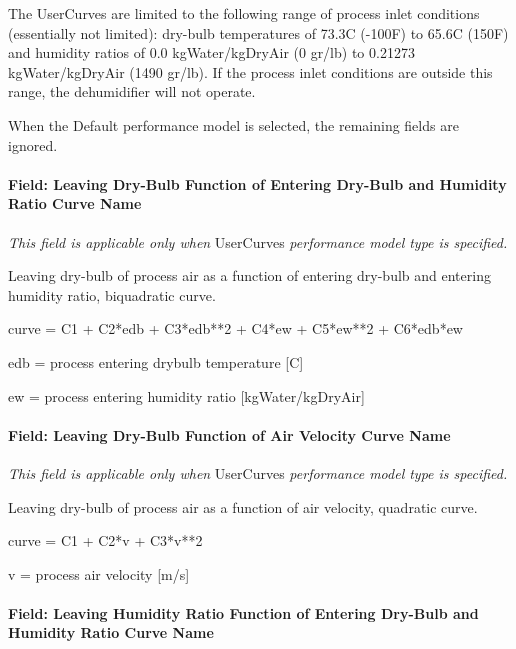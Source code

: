 The UserCurves are limited to the following range of process inlet conditions (essentially not limited): dry-bulb temperatures of 73.3C (-100F) to 65.6C (150F) and humidity ratios of 0.0 kgWater/kgDryAir (0 gr/lb) to 0.21273 kgWater/kgDryAir (1490 gr/lb). If the process inlet conditions are outside this range, the dehumidifier will not operate.

When the Default performance model is selected, the remaining fields are ignored.

\paragraph{Field: Leaving Dry-Bulb Function of Entering Dry-Bulb and Humidity Ratio Curve Name}\label{field-leaving-dry-bulb-function-of-entering-dry-bulb-and-humidity-ratio-curve-name}

\emph{This field is applicable only when} UserCurves \emph{performance model type is specified.}

Leaving dry-bulb of process air as a function of entering dry-bulb and entering humidity ratio, biquadratic curve.

curve = C1 + C2*edb + C3*edb**2 + C4*ew + C5*ew**2 + C6*edb*ew

edb = process entering drybulb temperature {[}C{]}

ew = process entering humidity ratio {[}kgWater/kgDryAir{]}

\paragraph{Field: Leaving Dry-Bulb Function of Air Velocity Curve Name}\label{field-leaving-dry-bulb-function-of-air-velocity-curve-name}

\emph{This field is applicable only when} UserCurves \emph{performance model type is specified.}

Leaving dry-bulb of process air as a function of air velocity, quadratic curve.

curve = C1 + C2*v + C3*v**2

v = process air velocity {[}m/s{]}

\paragraph{Field: Leaving Humidity Ratio Function of Entering Dry-Bulb and Humidity Ratio Curve Name}\label{field-leaving-humidity-ratio-function-of-entering-dry-bulb-and-humidity-ratio-curve-name}

